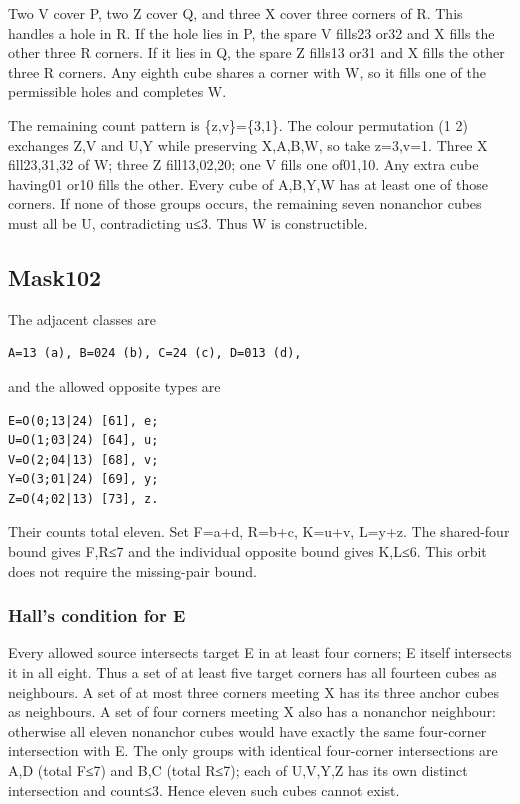 \documentclass[
  10pt,
]{article}
\begin{document}
Two V cover P, two Z cover Q, and three X cover three corners of R. This
handles a hole in R. If the hole lies in P, the spare V fills23 or32 and
X fills the other three R corners. If it lies in Q, the spare Z fills13
or31 and X fills the other three R corners. Any eighth cube shares a
corner with W, so it fills one of the permissible holes and completes W.

The remaining count pattern is \{z,v\}=\{3,1\}. The colour permutation
(1 2) exchanges Z,V and U,Y while preserving X,A,B,W, so take z=3,v=1.
Three X fill23,31,32 of W; three Z fill13,02,20; one V fills one
of01,10. Any extra cube having01 or10 fills the other. Every cube of
A,B,Y,W has at least one of those corners. If none of those groups
occurs, the remaining seven nonanchor cubes must all be U, contradicting
u≤3. Thus W is constructible.

\hypertarget{mask102}{%
\subsection*{Mask102}\label{mask102}}

The adjacent classes are

\begin{verbatim}
A=13 (a), B=024 (b), C=24 (c), D=013 (d),
\end{verbatim}

and the allowed opposite types are

\begin{verbatim}
E=O(0;13|24) [61], e;
U=O(1;03|24) [64], u;
V=O(2;04|13) [68], v;
Y=O(3;01|24) [69], y;
Z=O(4;02|13) [73], z.
\end{verbatim}

Their counts total eleven. Set F=a+d, R=b+c, K=u+v, L=y+z. The
shared-four bound gives F,R≤7 and the individual opposite bound gives
K,L≤6. This orbit does not require the missing-pair bound.

\hypertarget{halls-condition-for-e}{%
\subsubsection*{Hall's condition for E}\label{halls-condition-for-e}}

Every allowed source intersects target E in at least four corners; E
itself intersects it in all eight. Thus a set of at least five target
corners has all fourteen cubes as neighbours. A set of at most three
corners meeting X has its three anchor cubes as neighbours. A set of
four corners meeting X also has a nonanchor neighbour: otherwise all
eleven nonanchor cubes would have exactly the same four-corner
intersection with E. The only groups with identical four-corner
intersections are A,D (total F≤7) and B,C (total R≤7); each of U,V,Y,Z
has its own distinct intersection and count≤3. Hence eleven such cubes
cannot exist.
\end{document}
